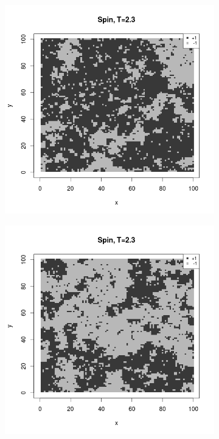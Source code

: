 \documentclass{scrartcl}
\begin{document}
\begin{figure}[ht]
\centering
\begin{subfigure}{.5\textwidth}
  \centering
  \includegraphics[width=1\linewidth]{spins/spinT2_3_1}
\end{subfigure}%
\begin{subfigure}{.5\textwidth}
  \centering
  \includegraphics[width=1\linewidth]{spins/spinT2_3_2}

\end{subfigure}
\end{figure}
\end{document}
